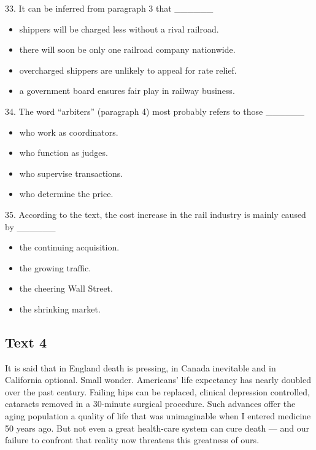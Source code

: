 \documentclass[UTF8,11pt]{ctexart}
\begin{document}
33. It can be inferred from paragraph 3 that \_\_\_\_\_\_


\begin{itemize}[leftmargin=2em,itemsep=.2em,topsep=.4em]\item[A.] shippers will be charged less without a rival railroad.
\item[B.] there will soon be only one railroad company nationwide.
\item[C.] overcharged shippers are unlikely to appeal for rate relief.
\item[D.] a government board ensures fair play in railway business.
\end{itemize}

34. The word “arbiters” (paragraph 4) most probably refers to those \_\_\_\_\_\_


\begin{itemize}[leftmargin=2em,itemsep=.2em,topsep=.4em]\item[A.] who work as coordinators.
\item[B.] who function as judges.
\item[C.] who supervise transactions.
\item[D.] who determine the price.
\end{itemize}

35. According to the text, the cost increase in the rail industry is mainly caused by \_\_\_\_\_\_


\begin{itemize}[leftmargin=2em,itemsep=.2em,topsep=.4em]\item[A.] the continuing acquisition.
\item[B.] the growing traffic.
\item[C.] the cheering Wall Street.
\item[D.] the shrinking market.
\end{itemize}

\subsection*{\textbf{Text 4}}


It is said that in England death is pressing, in Canada inevitable and in California optional. Small wonder. Americans’ life expectancy has nearly doubled over the past century. Failing hips can be replaced, clinical depression controlled, cataracts removed in a 30-minute surgical procedure. Such advances offer the aging population a quality of life that was unimaginable when I entered medicine 50 years ago. But not even a great health-care system can cure death — and our failure to confront that reality now threatens this greatness of ours.
\end{document}
